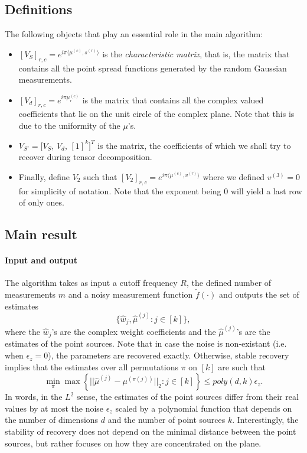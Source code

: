 \subsection{Definitions}
The following objects that play an essential role in the main algorithm:
\begin{itemize}
    \item $[V_S]_{r,c}=e^{i\pi\langle\mu^{(c)},s^{(r)}\rangle}$ is the \textit{characteristic matrix}, that is, the matrix that contains all the point spread functions generated by the random Gaussian measurements.
    \item $[V_d]_{r,c}=e^{i\pi\mu_r^{(c)}}$ is the matrix that contains all the complex valued coefficients that lie on the unit circle of the complex plane. Note that this is due to the uniformity of the $\mu$'s.
    \item $V_{S'}=\big[V_S,\, V_d,\, [1]^k\big]^T$ is the matrix, the coefficients of which we shall try to recover during tensor decomposition.
    \item Finally, define $V_2$ such that $[V_2]_{r,c}=e^{i\pi\langle\mu^{(c)},v^{(r)}\rangle}$ where we defined $v^{(3)}=0$ for simplicity of notation. Note that the exponent being 0 will yield a last row of only ones.
\end{itemize}
\subsection{Main result}
\paragraph{Input and output} The algorithm takes as input a cutoff frequency $R$, the defined number of measurements $m$ and a noisy measurement function $\tilde{f}(\cdot)$ and outputs the set of estimates $$\{\widehat{w}_j,\widehat{\mu}^{(j)}:j\in[k]\},$$ where the $\widehat{w}_j$'s are the complex weight coefficients and the $\widehat{\mu}^{(j)}$'s are the estimates of the point sources. Note that in case the noise is non-existant (i.e. when $\epsilon_z=0$), the parameters are recovered exactly. Otherwise, stable recovery implies that the estimates over all permutations $\pi$ on $[k]$ are such that $$\min_\pi\max\left\{||\widehat{\mu}^{(j)}-\mu^{(\pi(j))}||_2:j\in[k]\right\}\leq poly(d,k)\epsilon_z.$$ In words, in the $L^2$ sense, the estimates of the point sources differ from their real values by at most the noise $\epsilon_z$ scaled by a polynomial function that depends on the number of dimensions $d$ and the number of point sources $k$. Interestingly, the stability of recovery does not depend on the minimal distance between the point sources, but rather focuses on how they are concentrated on the plane.
